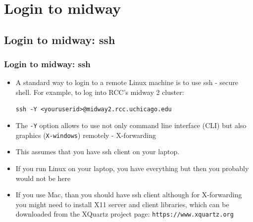 \documentclass{beamer}
\begin{document}
\section{Login to midway}

\subsection{Login to midway: ssh}
\begin{frame}[fragile]
  \frametitle{Login to midway: ssh}
  \begin{itemize}
  \item A standard way to login to a remote Linux machine is to use {\color{mycolorcli}ssh} - {\color{mycolordef}s}ecure {\color{mycolordef}sh}ell. For example, to log into RCC's midway 2 cluster:
{\color{mycolorcli}
\begin{verbatim}
ssh -Y <youruserid>@midway2.rcc.uchicago.edu
\end{verbatim}
}
  \item The {\color{mycolorcli}\verb|-Y|} option allows to use not only command line interface (CLI) but also graphics (\verb|X-windows|) remotely - {\color{mycolordef}X-forwarding}
  \item This assumes that you have ssh client on your laptop.
  \item If you run Linux on your laptop, you have everything but then you probably would not be here
  \item If you use Mac, than you should have ssh client although for X-forwarding you might need to install X11 server and client libraries, 
    which can be downloaded from the XQuartz project page: {\color{mycolorcli}\verb|https://www.xquartz.org|}
  \end{itemize}
\end{frame}
\end{document}
